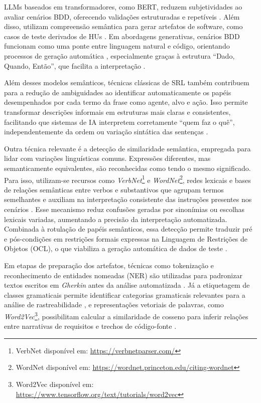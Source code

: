LLMs baseados em transformadores, como BERT, reduzem subjetividades ao avaliar cenários BDD, oferecendo validações estruturadas e repetíveis \cite{Alinezhadtilaki2025}. Além disso, utilizam compreensão semântica para gerar artefatos de software, como casos de teste derivados de HUs \cite{Ferreira2025}. Em abordagens generativas, cenários BDD funcionam como uma ponte entre linguagem natural e código, orientando processos de geração automática \cite{Zhang2025}, especialmente graças à estrutura “Dado, Quando, Então”, que facilita a interpretação \cite{Paduraru2025}.

Além desses modelos semânticos, técnicas clássicas de SRL também contribuem para a redução de ambiguidades ao identificar automaticamente os papéis desempenhados por cada termo da frase como agente, alvo e ação. Isso permite transformar descrições informais em estruturas mais claras e consistentes, facilitando que sistemas de IA interpretem corretamente “quem faz o quê”, independentemente da ordem ou variação sintática das sentenças \cite{Wang2022}.

Outra técnica relevante é a detecção de similaridade semântica, empregada para lidar com variações linguísticas comuns. Expressões diferentes, mas semanticamente equivalentes, são reconhecidas como tendo o mesmo significado. Para isso, utilizam-se recursos como \textit{VerbNet}\footnote{VerbNet disponível em: \url{https://verbnetparser.com/}} e \textit{WordNet}\footnote{WordNet disponível em: \url{https://wordnet.princeton.edu/citing-wordnet}}, redes lexicais e bases de relações semânticas entre verbos e substantivos que agrupam termos semelhantes e auxiliam na interpretação consistente das instruções presentes nos cenários \cite{Wang2022}. Esse mecanismo reduz confusões geradas por sinonímias ou escolhas lexicais variadas, aumentando a precisão da interpretação automatizada. Combinada à rotulação de papéis semânticos, essa detecção permite traduzir pré e pós-condições em restrições formais expressas na Linguagem de Restrições de Objetos (OCL), o que viabiliza a geração automática de dados de teste \cite{Wang2022}.

Em etapas de preparação dos artefatos, técnicas como tokenização e reconhecimento de entidades nomeadas (NER) são utilizadas para padronizar textos escritos em \textit{Gherkin} antes da análise automatizada \cite{Wang2022}. Já a etiquetagem de classes gramaticais permite identificar categorias gramaticais relevantes para a análise de rastreabilidade \cite{Gudaparthi2023}, e representações vetoriais de palavras, como \textit{Word2Vec}\footnote{Word2Vec disponível em: \url{https://www.tensorflow.org/text/tutorials/word2vec}}, possibilitam calcular a similaridade de cosseno para inferir relações entre narrativas de requisitos e trechos de código-fonte \cite{Rotaru2023}.

